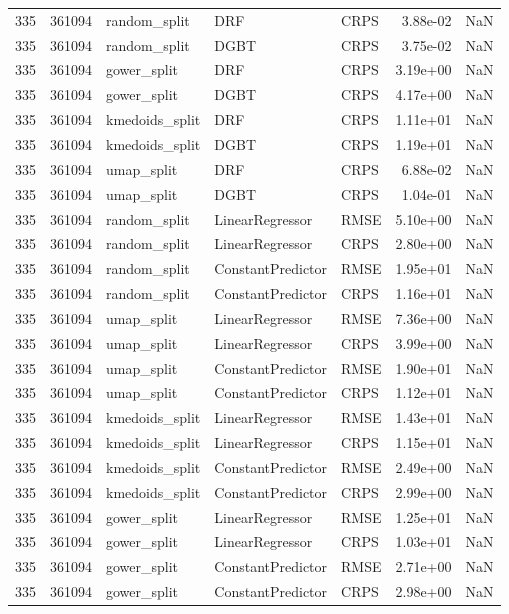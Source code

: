\begin{tabular}{rrlllrr}
335 & 361094 & random\_split & DRF & CRPS & 3.88e-02 & NaN \\
335 & 361094 & random\_split & DGBT & CRPS & 3.75e-02 & NaN \\
335 & 361094 & gower\_split & DRF & CRPS & 3.19e+00 & NaN \\
335 & 361094 & gower\_split & DGBT & CRPS & 4.17e+00 & NaN \\
335 & 361094 & kmedoids\_split & DRF & CRPS & 1.11e+01 & NaN \\
335 & 361094 & kmedoids\_split & DGBT & CRPS & 1.19e+01 & NaN \\
335 & 361094 & umap\_split & DRF & CRPS & 6.88e-02 & NaN \\
335 & 361094 & umap\_split & DGBT & CRPS & 1.04e-01 & NaN \\
335 & 361094 & random\_split & LinearRegressor & RMSE & 5.10e+00 & NaN \\
335 & 361094 & random\_split & LinearRegressor & CRPS & 2.80e+00 & NaN \\
335 & 361094 & random\_split & ConstantPredictor & RMSE & 1.95e+01 & NaN \\
335 & 361094 & random\_split & ConstantPredictor & CRPS & 1.16e+01 & NaN \\
335 & 361094 & umap\_split & LinearRegressor & RMSE & 7.36e+00 & NaN \\
335 & 361094 & umap\_split & LinearRegressor & CRPS & 3.99e+00 & NaN \\
335 & 361094 & umap\_split & ConstantPredictor & RMSE & 1.90e+01 & NaN \\
335 & 361094 & umap\_split & ConstantPredictor & CRPS & 1.12e+01 & NaN \\
335 & 361094 & kmedoids\_split & LinearRegressor & RMSE & 1.43e+01 & NaN \\
335 & 361094 & kmedoids\_split & LinearRegressor & CRPS & 1.15e+01 & NaN \\
335 & 361094 & kmedoids\_split & ConstantPredictor & RMSE & 2.49e+00 & NaN \\
335 & 361094 & kmedoids\_split & ConstantPredictor & CRPS & 2.99e+00 & NaN \\
335 & 361094 & gower\_split & LinearRegressor & RMSE & 1.25e+01 & NaN \\
335 & 361094 & gower\_split & LinearRegressor & CRPS & 1.03e+01 & NaN \\
335 & 361094 & gower\_split & ConstantPredictor & RMSE & 2.71e+00 & NaN \\
335 & 361094 & gower\_split & ConstantPredictor & CRPS & 2.98e+00 & NaN \\

\end{tabular}
